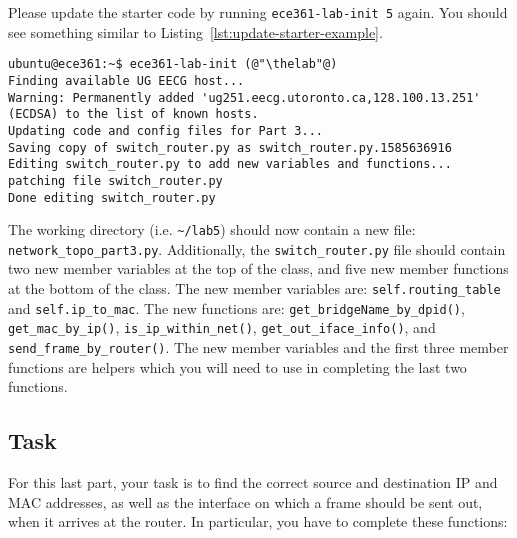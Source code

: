 \documentclass[11pt]{article}
\def\thelab{5}
\begin{document}
Please update the starter code by running \texttt{ece361-lab-init \thelab} again. You should see something similar to Listing~\ref{lst:update-starter-example}.

\begin{lstlisting}[style=ece361shell, caption={Updating the lab \thelab~starter code.}, label={lst:update-starter-example}]
ubuntu@ece361:~$ ece361-lab-init (@"\thelab"@)
Finding available UG EECG host...
Warning: Permanently added 'ug251.eecg.utoronto.ca,128.100.13.251' (ECDSA) to the list of known hosts.
Updating code and config files for Part 3...
Saving copy of switch_router.py as switch_router.py.1585636916
Editing switch_router.py to add new variables and functions...
patching file switch_router.py
Done editing switch_router.py
\end{lstlisting}

The working directory (i.e. \texttt{\textasciitilde/lab\thelab}) should now contain a new file: \texttt{network\_topo\_part3.py}.
Additionally, the \texttt{switch\_router.py} file should contain two new member variables at the top of the class, and five new member functions at the bottom of the class. The new member variables are: \texttt{self.routing\_table} and \texttt{self.ip\_to\_mac}. The new functions are: \texttt{get\_bridgeName\_by\_dpid()}, \texttt{get\_mac\_by\_ip()}, \texttt{is\_ip\_within\_net()}, \texttt{get\_out\_iface\_info()}, and \texttt{send\_frame\_by\_router()}. The new member variables and the first three member functions are helpers which you will need to use in completing the last two functions.

\subsection{Task}
\label{subsec:routing}
For this last part, your task is to find the correct source and destination IP and MAC addresses, as well as the interface on which a frame should be sent out, when it arrives at the router. In particular, you have to complete these functions:
\end{document}
